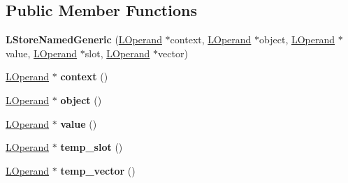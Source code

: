 \subsection*{Public Member Functions}
\begin{DoxyCompactItemize}
\item 
{\bfseries L\+Store\+Named\+Generic} (\hyperlink{classv8_1_1internal_1_1_l_operand}{L\+Operand} $\ast$context, \hyperlink{classv8_1_1internal_1_1_l_operand}{L\+Operand} $\ast$object, \hyperlink{classv8_1_1internal_1_1_l_operand}{L\+Operand} $\ast$value, \hyperlink{classv8_1_1internal_1_1_l_operand}{L\+Operand} $\ast$slot, \hyperlink{classv8_1_1internal_1_1_l_operand}{L\+Operand} $\ast$vector)\hypertarget{classv8_1_1internal_1_1_l_store_named_generic_a5e3f7dd8c808499319eaac553c49aea7}{}\label{classv8_1_1internal_1_1_l_store_named_generic_a5e3f7dd8c808499319eaac553c49aea7}

\item 
\hyperlink{classv8_1_1internal_1_1_l_operand}{L\+Operand} $\ast$ {\bfseries context} ()\hypertarget{classv8_1_1internal_1_1_l_store_named_generic_ae430bd465f69e64a24f1f9f99a9c91ad}{}\label{classv8_1_1internal_1_1_l_store_named_generic_ae430bd465f69e64a24f1f9f99a9c91ad}

\item 
\hyperlink{classv8_1_1internal_1_1_l_operand}{L\+Operand} $\ast$ {\bfseries object} ()\hypertarget{classv8_1_1internal_1_1_l_store_named_generic_aa1b18be662cea0c3778374ff8b43defe}{}\label{classv8_1_1internal_1_1_l_store_named_generic_aa1b18be662cea0c3778374ff8b43defe}

\item 
\hyperlink{classv8_1_1internal_1_1_l_operand}{L\+Operand} $\ast$ {\bfseries value} ()\hypertarget{classv8_1_1internal_1_1_l_store_named_generic_aec8db1a93603a3b4113708cbceebcec8}{}\label{classv8_1_1internal_1_1_l_store_named_generic_aec8db1a93603a3b4113708cbceebcec8}

\item 
\hyperlink{classv8_1_1internal_1_1_l_operand}{L\+Operand} $\ast$ {\bfseries temp\+\_\+slot} ()\hypertarget{classv8_1_1internal_1_1_l_store_named_generic_a18a6a60e809a89d7846e671670701c0d}{}\label{classv8_1_1internal_1_1_l_store_named_generic_a18a6a60e809a89d7846e671670701c0d}

\item 
\hyperlink{classv8_1_1internal_1_1_l_operand}{L\+Operand} $\ast$ {\bfseries temp\+\_\+vector} ()\hypertarget{classv8_1_1internal_1_1_l_store_named_generic_a128a00fb66f92d2aafae55ae0b99b887}{}\label{classv8_1_1internal_1_1_l_store_named_generic_a128a00fb66f92d2aafae55ae0b99b887}


\end{DoxyCompactItemize}
